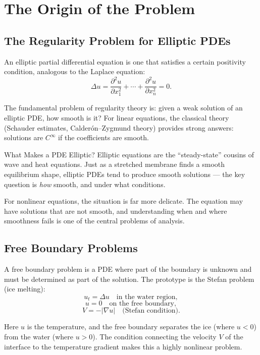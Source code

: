 \section{The Origin of the Problem}

\subsection{The Regularity Problem for Elliptic PDEs}

An elliptic partial differential equation is one that satisfies a certain positivity condition, analogous to the Laplace equation:
\[
\Delta u = \frac{\partial^2 u}{\partial x_1^2} + \cdots + \frac{\partial^2 u}{\partial x_n^2} = 0.
\]

The fundamental problem of regularity theory is: given a weak solution of an elliptic PDE, how smooth is it? For linear equations, the classical theory (Schauder estimates, Calder\'on--Zygmund theory) provides strong answers: solutions are $C^\infty$ if the coefficients are smooth.

\begin{knowledgebridge}{What Makes a PDE Elliptic?}
Elliptic equations are the ``steady-state'' cousins of wave and heat equations. Just as a stretched membrane finds a smooth equilibrium shape, elliptic PDEs tend to produce smooth solutions --- the key question is \emph{how} smooth, and under what conditions.
\end{knowledgebridge}

For nonlinear equations, the situation is far more delicate. The equation may have solutions that are not smooth, and understanding when and where smoothness fails is one of the central problems of analysis.

\subsection{Free Boundary Problems}

A free boundary problem is a PDE where part of the boundary is unknown and must be determined as part of the solution. The prototype is the Stefan problem (ice melting):
\[
u_t = \Delta u \quad \text{in the water region},
\]
\[
u = 0 \quad \text{on the free boundary},
\]
\[
V = -|\nabla u| \quad \text{(Stefan condition)}.
\]

Here $u$ is the temperature, and the free boundary separates the ice (where $u < 0$) from the water (where $u > 0$). The condition connecting the velocity $V$ of the interface to the temperature gradient makes this a highly nonlinear problem.

